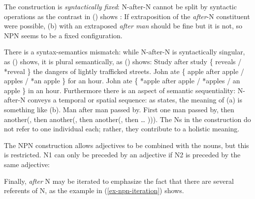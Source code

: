 \documentclass[output=paper
	        ,collection
	        ,collectionchapter
 	        ,biblatex
                ,babelshorthands
                ,newtxmath
                ,draftmode
                ,colorlinks, citecolor=brown
]{langscibook}
\begin{document}
\eal
\settowidth{}
\zl

The construction is \emph{syntactically fixed}: N-after-N cannot be split by syntactic operations as the
contrast in () shows \citep{Matsuyama2004a}:
\eal
{}
\zl
If extraposition of the \emph{after}-N constituent were possible, (b) with an extraposed
\emph{after man} should be fine but it is not, so NPN seems to be a fixed configuration.

There is a syntax-semantics mismatch:
while N-after-N is syntactically singular, as () shows, it is plural semantically, as
() shows:
\ea
Study after study \{ reveals / *reveal \} the dangers of lightly trafficked streets.
\z
\eal
\ex John ate \{ apple after apple / apples / *an apple \} for an hour. 
\ex John ate \{ *apple after apple / *apples / an apple \} in an hour.
\zl
Furthermore there is an aspect of semantic sequentiality: N-after-N conveys a temporal or spatial
sequence: as \citet{Bargmann2015a} states, the meaning of (a) is something like (b).
\eal
\ex Man after man passed by. 
\ex First one man passed by, then another(, then another(, then another(, then  \ldots{} ))). 
\zl
The Ns in the construction do not refer to one individual each; rather, they contribute to a holistic meaning.

The NPN construction allows adjectives to be combined with the nouns, but this is restricted.
N1 can only be preceded by an adjective if N2 is preceded by the same adjective: 
\eal
{}
\zl

Finally, \emph{after} N may be iterated to emphasize the fact that there are several referents of N, as the example in (\ref{ex-npn-iteration}) shows. 
\end{document}
